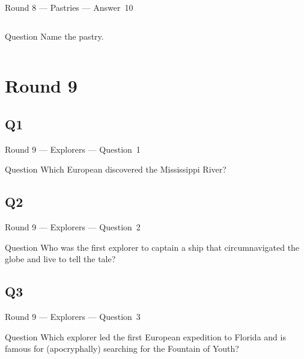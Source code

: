 \documentclass[11pt]{beamer}
\begin{document}
\begin{frame}[t]{Round 8 --- Pastries --- \mbox{Answer 10}}
\begin{columns}[T,totalwidth=\linewidth]
\begin{column}{0.32\linewidth}
\begin{block}{Question}
Name the pastry.
\end{block}
\end{column}
\begin{column}{0.65\linewidth}
\begin{center}
\texttt{[image: \{Images/baklava]}.jpg}
\end{center}
\end{column}
\end{columns}
\end{frame}
\def\thisSectionName{Explorers}
\section{Round 9}
\subsection*{Q1}
\begin{frame}[t]{Round 9 --- Explorers --- \mbox{Question 1}}
\begin{block}{Question}
Which European discovered the Mississippi River?
\end{block}
\end{frame}
\subsection*{Q2}
\begin{frame}[t]{Round 9 --- Explorers --- \mbox{Question 2}}
\begin{block}{Question}
Who was the first explorer to captain a ship that circumnavigated the globe and live to tell the tale?
\end{block}
\end{frame}
\subsection*{Q3}
\begin{frame}[t]{Round 9 --- Explorers --- \mbox{Question 3}}
\begin{block}{Question}
Which explorer led the first European expedition to Florida and is famous for (apocryphally) searching for the Fountain of Youth?
\end{block}
\end{frame}
\end{document}
